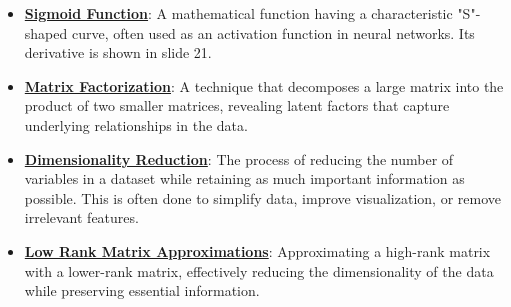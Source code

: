 \documentclass{article}%
\begin{document}
\begin{itemize}[leftmargin=*]
\item \href{https://www.math.purdue.edu/~yipn/351/04L1-Linear Algebra Primer.pdf#page=21}{\textbf{Sigmoid Function}}: A mathematical function having a characteristic "S"-shaped curve, often used as an activation function in neural networks. Its derivative is shown in slide 21.%
\item \href{https://www.math.purdue.edu/~yipn/351/11L2-svd-pca-recommender.pdf#page=2}{\textbf{Matrix Factorization}}: A technique that decomposes a large matrix into the product of two smaller matrices, revealing latent factors that capture underlying relationships in the data.%
\item \href{https://www.math.purdue.edu/~yipn/351/11L2-svd-pca-recommender.pdf#page=8}{\textbf{Dimensionality Reduction}}: The process of reducing the number of variables in a dataset while retaining as much important information as possible. This is often done to simplify data, improve visualization, or remove irrelevant features.%
\item \href{https://www.math.purdue.edu/~yipn/351/11L2-svd-pca-recommender.pdf#page=9}{\textbf{Low Rank Matrix Approximations}}: Approximating a high-rank matrix with a lower-rank matrix, effectively reducing the dimensionality of the data while preserving essential information.%
\end{itemize}

%
\end{document}
